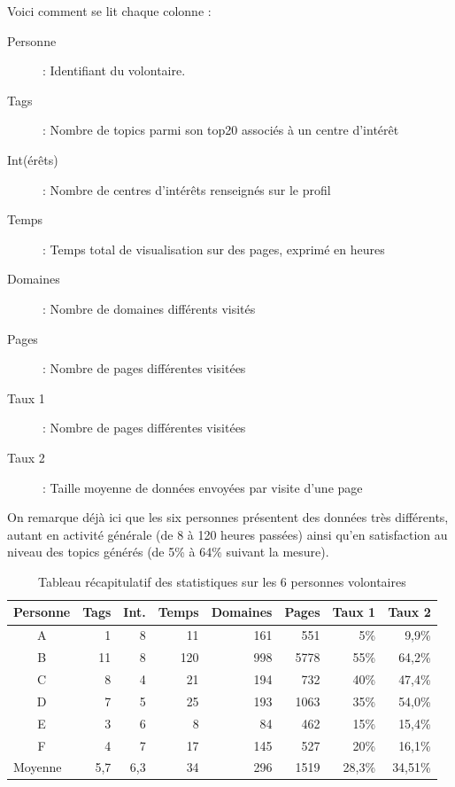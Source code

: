 			Voici comment se lit chaque colonne :
			\begin{description}
				\item[Personne] : Identifiant du volontaire.
				\item[Tags] : Nombre de topics parmi son top20 associés à un centre d'intérêt
				\item[Int(érêts)] : Nombre de centres d'intérêts renseignés sur le profil
				\item[Temps] : Temps total de visualisation sur des pages, exprimé en heures
				\item[Domaines] : Nombre de domaines différents visités
				\item[Pages] : Nombre de pages différentes visitées
				\item[Taux 1] : Nombre de pages différentes visitées
				\item[Taux 2] : Taille moyenne de données envoyées par visite d'une page      
			\end{description}

			On remarque déjà ici que les six personnes présentent des données très différents, autant en activité générale (de 8 à 120 heures passées) ainsi qu'en satisfaction au niveau des topics générés (de 5\% à 64\% suivant la mesure). 

			\begin{table}[]
\centering
\begin{tabular}{crrrrrrr}
\multicolumn{1}{l}{\textbf{Personne}} & \multicolumn{1}{l}{\textbf{Tags}} & \multicolumn{1}{l}{\textbf{Int.}} & \multicolumn{1}{l}{\textbf{Temps}} & \multicolumn{1}{l}{\textbf{Domaines}} & \multicolumn{1}{l}{\textbf{Pages}} & \multicolumn{1}{l}{\textbf{Taux 1}} & \multicolumn{1}{l}{\textbf{Taux 2}} \\ \hline
A & 1 & 8 & 11 & 161 & 551 & 5\% & 9,9\% \\
B & 11 & 8 & 120 & 998 & 5778 & 55\% & 64,2\% \\
C & 8 & 4 & 21 & 194 & 732 & 40\% & 47,4\% \\
D & 7 & 5 & 25 & 193 & 1063 & 35\% & 54,0\% \\
E & 3 & 6 & 8 & 84 & 462 & 15\% & 15,4\% \\
F & 4 & 7 & 17 & 145 & 527 & 20\% & 16,1\% \\ \hline
\multicolumn{1}{l}{Moyenne} & 5,7 & 6,3 & 34 & 296 & 1519 & 28,3\% & 34,51\%
\end{tabular}
\caption{Tableau récapitulatif des statistiques sur les 6 personnes volontaires}
\label{profiles-table}
\end{table}

